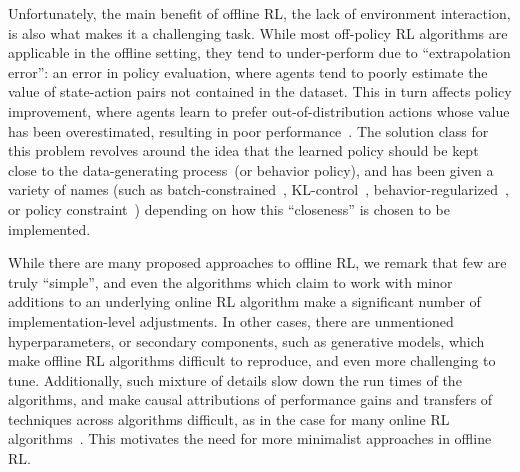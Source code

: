 \documentclass{article}
\begin{document}
Unfortunately, the main benefit of offline RL, the lack of environment interaction, is also what makes it a challenging task. While most off-policy RL algorithms are applicable in the offline setting, they tend to under-perform due to ``extrapolation error'': an error in policy evaluation, where agents tend to poorly estimate the value of state-action pairs not contained in the dataset. This in turn affects policy improvement, where agents learn to prefer out-of-distribution actions whose value has been overestimated, resulting in poor performance~\citep{fujimoto2018off}. The solution class for this problem revolves around the idea that the learned policy should be kept close to the data-generating process~(or behavior policy), and has been given a variety of names (such as batch-constrained~\citep{fujimoto2018off}, KL-control~\citep{jaques2019way}, behavior-regularized~\citep{wu2019behavior}, or policy constraint~\citep{levine2020offline}) depending on how this ``closeness'' is chosen to be implemented. 

While there are many proposed approaches to offline RL, we remark that few are truly ``simple'', and even the algorithms which claim to work with minor additions to an underlying online RL algorithm make a significant number of implementation-level adjustments. In other cases, there are unmentioned hyperparameters, or secondary components, such as generative models, which make offline RL algorithms difficult to reproduce, and even more challenging to tune. Additionally, such mixture of details slow down the run times of the algorithms, and make causal attributions of performance gains and transfers of techniques across algorithms difficult, as in the case for many online RL algorithms~\citep{henderson2017deep,tucker18amirage,Engstrom2020Implementation,andrychowicz2021what,furuta2021identifying}. This motivates the need for more minimalist approaches in offline RL.  
\end{document}
